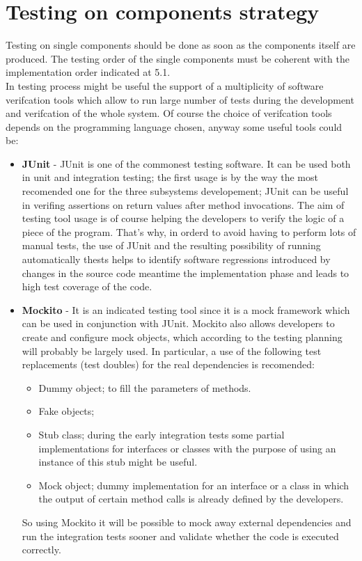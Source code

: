 \section{Testing on components strategy}
Testing on single components should be done as soon as the components itself are produced. The testing order of the single components must be coherent with the implementation order indicated at 5.1. \\ 
In testing process might be useful the support of a multiplicity of software verifcation tools which allow to run large number of tests during the development and verifcation of the whole system. Of course the choice of verifcation tools depends on the programming language chosen, anyway some useful tools could be:
\begin{itemize}
\item \textbf{JUnit} - JUnit is one of the commonest testing software. It can be used both in unit and integration testing; the first usage is by the way the most recomended one for the three subsystems developement; JUnit can be useful in verifing assertions on return values after method invocations. The aim of testing tool usage is of course helping the developers to verify the logic of a piece of the program. That's why, in orderd to avoid having to perform lots of manual tests, the use of JUnit and the resulting possibility of running automatically thests helps to identify software regressions introduced by changes in the source code meantime the implementation phase and leads to high test coverage of the code.

\item \textbf{Mockito} - It is an indicated testing tool since it is a mock framework which can be used in conjunction with JUnit. Mockito also allows developers to create and configure mock objects, which according to the testing planning will probably be largely used. In particular, a use of the following test replacements (test doubles) for the real dependencies is recomended:
\begin{itemize}
\item Dummy object; to fill the parameters of methods.

\item Fake objects; 

\item Stub class; during the early integration tests some partial implementations for interfaces or classes with the purpose of using an instance of this stub might be useful.

\item Mock object; dummy implementation for an interface or a class in which the output of certain method calls is already defined by the developers. 
\end{itemize}
So using Mockito it will be possible to mock away external dependencies and run the integration tests sooner and validate whether the code is executed correctly.


\end{itemize}
